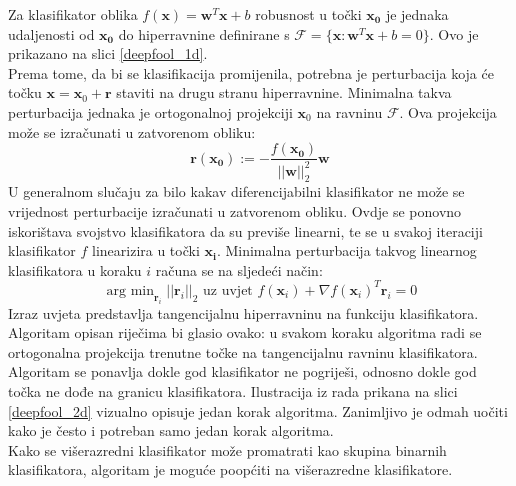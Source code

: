 \documentclass[utf8, diplomski]{fer}
\begin{document}
Za klasifikator oblika $f(\boldsymbol{x}) = \boldsymbol{w}^{T}\boldsymbol{x} + b$ robusnost u točki $\boldsymbol{x_{0}}$ je jednaka udaljenosti od $\boldsymbol{x_{0}}$ do hiperravnine definirane s $\mathscr{F} = \{\boldsymbol{x} : \boldsymbol{w}^{T}\boldsymbol{x}+b=0\}$. Ovo je prikazano na slici \ref{deepfool_1d}. \\
Prema tome, da bi se klasifikacija promijenila, potrebna je perturbacija koja će točku $\boldsymbol{x} = \boldsymbol{x}_{0} + \boldsymbol{r}$ staviti na drugu stranu hiperravnine. Minimalna takva perturbacija jednaka je ortogonalnoj projekciji $\boldsymbol{x}_{0}$ na ravninu $\mathscr{F}$. Ova projekcija može se izračunati u zatvorenom obliku:
\begin{equation}
	\boldsymbol{r}(\boldsymbol{x_{0}}) := - \frac{f(\boldsymbol{x_{0}})}{||\boldsymbol{w}||_{2}^{2}}\boldsymbol{w}
\end{equation}
U generalnom slučaju za bilo kakav diferencijabilni klasifikator ne može se vrijednost perturbacije izračunati u zatvorenom obliku. Ovdje se ponovno iskorištava svojstvo klasifikatora da su previše linearni, te se u svakoj iteraciji klasifikator $f$ linearizira u točki $\boldsymbol{x_{i}}$. Minimalna perturbacija takvog linearnog klasifikatora u koraku $i$ računa se na sljedeći način:
\begin{equation}
	\mathop{\text{arg min}}_{\boldsymbol{r}_{i}}||\boldsymbol{r}_{i}||_{2} \text{ uz uvjet } f(\boldsymbol{x}_{i}) + \nabla f(\boldsymbol{x}_{i})^{T}\boldsymbol{r}_{i} = 0
\end{equation}
Izraz uvjeta predstavlja tangencijalnu hiperravninu na funkciju klasifikatora. Algoritam opisan riječima bi glasio ovako: u svakom koraku algoritma radi se ortogonalna projekcija trenutne točke na tangencijalnu ravninu klasifikatora. Algoritam se ponavlja dokle god klasifikator ne pogriješi, odnosno dokle god točka ne dođe na granicu klasifikatora. Ilustracija iz rada prikana na slici \ref{deepfool_2d} vizualno opisuje jedan korak algoritma. Zanimljivo je odmah uočiti kako je često i potreban samo jedan korak algoritma. \\
Kako se višerazredni klasifikator može promatrati kao skupina binarnih klasifikatora, algoritam je moguće poopćiti na višerazredne klasifikatore. \\
\end{document}
